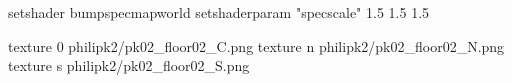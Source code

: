 setshader bumpspecmapworld
setshaderparam "specscale" 1.5 1.5 1.5

texture 0 philipk2/pk02_floor02_C.png
texture n philipk2/pk02_floor02_N.png
texture s philipk2/pk02_floor02_S.png

